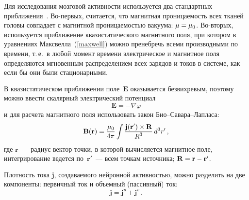 \begin{multicols}{2}
Для исследования мозговой активности используется два стандартных
приближения~\cite{hamalainen93}. Во-пер\-вых, считается, что магнитная
проницаемость всех тканей головы совпадает с магнитной
про\-ни\-ца\-емостью вакуума: $\mu \hm= \mu_0$. Во-вто\-рых, используется
приближение квазистатического магнитного поля, при котором в
уравнениях Максвелла~(\ref{maxwell})  можно пренебречь всеми
производными по времени, т.\,е.\ в любой момент времени
электрическое и магнитное поля определяются мгновенным
распределением всех зарядов и токов в системе, как если бы они были
стационарными.

В квазистатическом приближении поле~${\mathbf E}$ оказывается безвихревым,
поэтому можно ввести скалярный электрический потенциал
\begin{equation}
\label{varphi}
{\mathbf E} = - \nabla \varphi
\end{equation}
и для расчета магнитного поля использовать закон
Био--Савара--Лапласа:
\begin{equation}
\label{bsl}
\mathbf{B(r)} = \displaystyle\frac{\displaystyle \mu_0\mathstrut}{\displaystyle 4 \pi\mathstrut} \int
\displaystyle\frac{\displaystyle \mathbf{j(r')} \times \mathbf{R}\mathstrut}{\displaystyle R^3\mathstrut}\, d^3 r' \,,
\end{equation}
где $\mathbf{r}$~--- ра\-ди\-ус-век\-тор точки, в которой
вычисляется магнитное поле, интегрирование ведется по~$\mathbf{r'}$~---
всем точкам источника; $\mathbf{R} \hm= \mathbf{r}\hm - \mathbf{r'}$.

Плотность тока ${\mathbf j}$, создаваемого нейронной активностью,
можно разделить на две компоненты: первичный ток и объемный
(пассивный) ток:
\begin{equation}
\label{current}
\mathbf{j} = \mathbf{j}^p + \mathbf{j}^v \,.
\end{equation}


\end{multicols}

